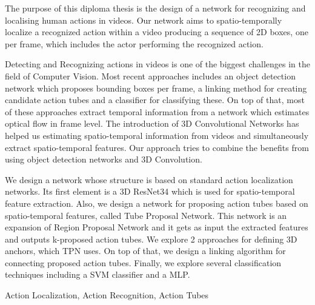 \documentclass[diploma]{softlab-thesis}
\begin{document}
\begin{abstracten}%

  The purpose of this diploma thesis is the design of a network for recognizing and localising human actions in videos.
  Our network aims to spatio-temporally localize a recognized action within a video
  producing a sequence of 2D boxes, one per frame, which includes the actor
  performing the recognized action.\par

  Detecting and Recognizing actions in videos is one of the biggest
  challenges in the field of Computer Vision. Most recent approaches
  includes an object detection network which proposes bounding boxes
  per frame, a linking method for creating candidate action tubes and
  a classifier for classifying these. On top of that, most of these
  approaches extract temporal information from a network which
  estimates optical flow in frame level. The introduction of 3D
  Convolutional Networks has helped us estimating spatio-temporal
  information from videos and simultaneously extract spatio-temporal
  features. Our approach tries to combine the benefits from using
  object detection networks and 3D Convolution.\par

  We design a network whose structure is based on standard action localization networks. Its first
  element is a 3D ResNet34 which is used for spatio-temporal feature extraction. Also,
  we design a network for proposing action tubes based on spatio-temporal features, called Tube Proposal Network.
  This network is an  expansion of Region Proposal Network and it gets as input the extracted features and
  outputs k-proposed action tubes.
  We explore 2 approaches for
  defining 3D anchors, which TPN uses. On top of that, we design a linking algorithm for
  connecting proposed action tubes. Finally, we explore several classification techniques
  including a SVM classifier and a MLP.

\begin{keywordsen}
Action Localization, Action Recognition, Action Tubes
\end{keywordsen}
\end{abstracten}



\end{document}
